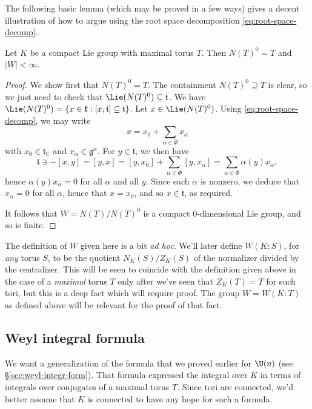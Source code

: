\documentclass[reqno]{amsart} 
\begin{document}
The following basic lemma (which may be proved in a few ways) gives a decent illustration of how to argue using the root space decomposition \eqref{eq:root-space-decomp}.
\begin{lemma}
  Let $K$ be a compact Lie group with maximal torus $T$.  Then $N(T)^0 = T$ and $|W| < \infty$.
\end{lemma}
\begin{proof}
  We show first that $N(T)^0 = T$.  The containment $N(T)^0 \supseteq T$ is clear, so we just need to check that $\Lie(N(T)^0) \subseteq \mathfrak{t}$.  We have $\Lie(N(T)^0) = \{x \in \mathfrak{k} : [x,\mathfrak{t}] \subseteq \mathfrak{t} \}$.  Let $x \in \Lie(N(T)^0)$.  Using \eqref{eq:root-space-decomp}, we may write
  \begin{equation*}
    x = x_0 + \sum_{\alpha \in \Phi} x_\alpha
  \end{equation*}
  with $x_0 \in \mathfrak{t}_{\mathbb{C}}$ and $x_\alpha \in \mathfrak{g}^{\alpha}$.  For $y \in \mathfrak{t}$, we then have
  \begin{equation*}
    \mathfrak{t} \ni - [x,y] = [y,x] = [y,x_0] + \sum_{\alpha \in \Phi} [y,x_\alpha] = \sum_{\alpha \in \Phi} \alpha(y) x_\alpha,
  \end{equation*}
  hence $\alpha(y) x_\alpha = 0$ for all $\alpha$ and all $y$.  Since each $\alpha$ is nonzero, we deduce that $x_\alpha = 0$ for all $\alpha$, hence that $x = x_0$, and so $x \in \mathfrak{t}$, as required.

  It follows that $W = N(T)/N(T)^0$ is a compact $0$-dimensional Lie group, and so is finite.
\end{proof}

\begin{remark}
  The definition of $W$ given here is a bit \emph{ad hoc}.  We'll later define $W(K:S)$, for \emph{any} torus $S$, to be the quotient $N_K(S)/Z_K(S)$ of the normalizer divided by the centralizer.  This will be seen to coincide with the definition given above in the case of a \emph{maximal} torus $T$ only after we've seen that $Z_K(T) = T$ for such tori, but this is a deep fact which will require proof.  The group $W = W(K:T)$ as defined above will be relevant for the proof of that fact.
\end{remark}

\subsection{Weyl integral formula}\label{sec:weyl-integr-form-general}
We want a generalization of the formula that we proved earlier for $\U(n)$ (see \S\ref{sec:weyl-integr-form}).  That formula expressed the integral over $K$ in terms of integrals over conjugates of a maximal torus $T$.  Since tori are connected, we'd better assume that $K$ is connected to have any hope for such a formula.
\end{document}
